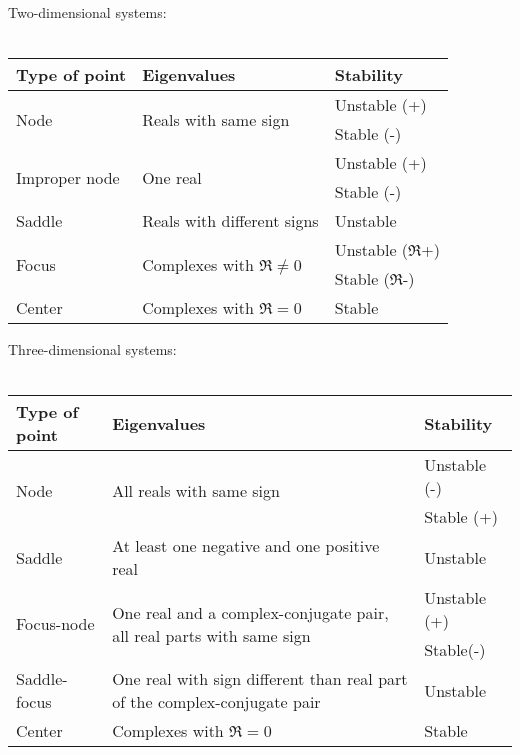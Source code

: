 \documentclass{form}
\begin{document}
\begin{center}
\begin{minipage}[c]{0.43\textwidth}
	Two-dimensional systems: \\ \\
	\begin{tabular}{p{24mm} p{22mm} p{24mm}} \hline \hline
		\textbf{Type of point} & \textbf{Eigenvalues} & \textbf{Stability} \\ \hline
			\multirow{2}{*}{Node } & \multirow{2}{20mm}{Reals with same sign} & Unstable (+) \\
			                       &                                          & Stable (-) \\ \hline
			\multirow{2}{*}{Improper node} & \multirow{2}{*}{One real}               & Unstable (+) \\
			                               &                                         & Stable (-)\\ \hline
			Saddle & Reals with different signs & Unstable \\ \hline
			\multirow{2}{*}{Focus} & \multirow{2}{20mm}{Complexes with $\Re \neq 0$} & Unstable ($\Re$+) \\
			                       &                                                 & Stable ($\Re$-) \\ \hline
			Center                 & Complexes with $\Re = 0$                        & Stable
		\\ \hline \hline
	\end{tabular}
\end{minipage}%
\begin{minipage}[c]{0.57\textwidth}
	Three-dimensional systems:\\ \\
	\begin{tabular}{p{24mm} p{52mm} p{25mm}} \hline \hline
		\textbf{Type of point} & \textbf{Eigenvalues} & \textbf{Stability} \\ \hline
		\multirow{2}{*}{Node} & \multirow{2}{52mm}{All reals with same sign} & Unstable (-) \\
		                      &                                & Stable (+) \\ \hline
		Saddle                & At least one negative and one positive real & Unstable \\ \hline
		\multirow{2}{*}{Focus-node} & \multirow{2}{52mm}{One real and a complex-conjugate pair, all real parts with same sign} & Unstable (+) \\
		                            & & Stable(-)\\ \hline
		Saddle-focus          & One real with sign different than real part of the complex-conjugate pair & Unstable \\ \hline
		Center                & Complexes with $\Re = 0$ & Stable
		\\ \hline \hline
	\end{tabular}
\end{minipage} \end{center}
\end{document}
